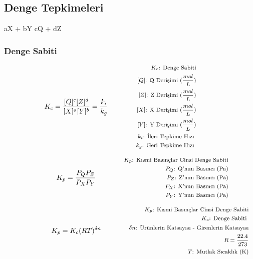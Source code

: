 \subsection{Denge Tepkimeleri}

\begin{chemmath}
    aX + bY
    \reactrarrow{0pt}{1.5cm}{}{}
    cQ + dZ
  \end{chemmath}

\subsubsection*{Denge Sabiti}
\begin{equation}
K_c = \frac{[Q]^c [Z]^d }{[X]^a [Y]^b} = \frac{k_i}{k_g} \qquad \qquad \parbox{4cm}{\footnotesize$\begin{aligned}
    K_c\text{: Denge Sabiti} \\
    [Q]\text{: Q Derişimi (} \frac{mol}{L} \text{)} \\
    [Z]\text{: Z Derişimi (} \frac{mol}{L} \text{)} \\
    [X]\text{: X Derişimi (} \frac{mol}{L} \text{)} \\
    [Y]\text{: Y Derişimi (} \frac{mol}{L} \text{)} \\
    k_i\text{: İleri Tepkime Hızı } \\
    k_g\text{: Geri Tepkime Hızı }
\end{aligned}$}
\end{equation}

\begin{equation}
K_p = \frac{P_Q P_Z }{P_X P_Y} \qquad \qquad \parbox{4cm}{\footnotesize$\begin{aligned}
    K_p\text{: Kısmi Basınçlar Cinsi Denge Sabiti} \\
    P_Q\text{: Q'nun Basıncı} \text{ (Pa)} \\
    P_Z\text{: Z'nun Basıncı} \text{ (Pa)} \\
    P_X\text{: X'nun Basıncı} \text{ (Pa)} \\
    P_Y\text{: Y'nun Basıncı} \text{ (Pa)}
\end{aligned}$}
\end{equation}

\begin{equation}
K_p = K_c (RT)^{\delta n} \qquad \qquad \parbox{4cm}{\footnotesize$\begin{aligned}
    K_p\text{: Kısmi Basınçlar Cinsi Denge Sabiti} \\
    K_c\text{: Denge Sabiti } \\
    \delta n\text{: Ürünlerin Katsayısı - Girenlerin Katsayısı} \\
    R = \frac{22.4}{273} \\
    T\text{: Mutlak Sıcaklık (K)}
\end{aligned}$}
\end{equation}

